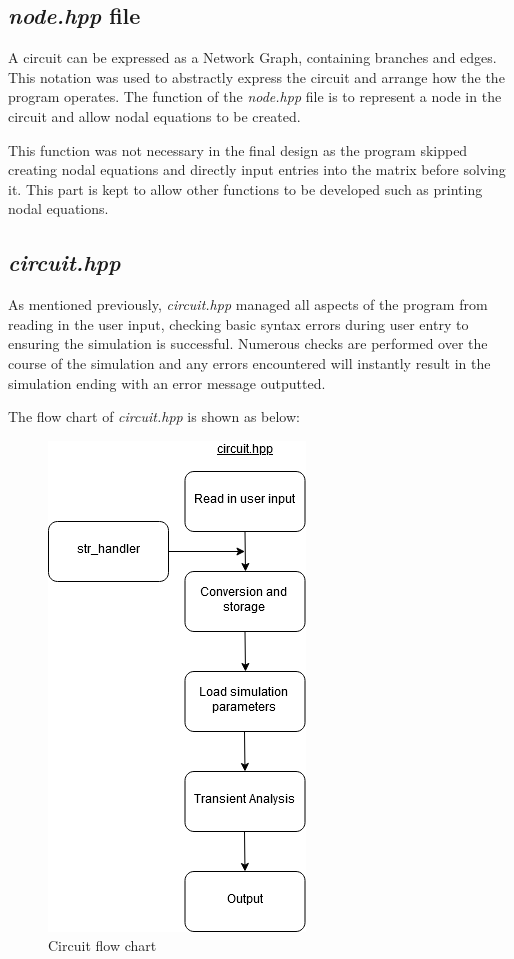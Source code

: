\documentclass[12pt,a4paper]{article}
\begin{document}
	\subsection{\textit{node.hpp} file}
	A circuit can be expressed as a Network Graph, containing branches and edges. This notation was used to abstractly express
	the circuit and arrange how the the program operates.
	The function of the \textit{node.hpp} file is to represent a node in the circuit and allow nodal equations
	to be created.\par
	This function was not necessary in the final design as the program skipped creating nodal
	equations and directly input entries into the matrix before solving it. This part is kept to allow other functions to 
	be developed such as printing nodal equations.
	\pagebreak
	\subsection{\textit{circuit.hpp}}
	As mentioned previously, \textit{circuit.hpp} managed all aspects of the program from 
	reading in the user input, checking basic syntax errors during user entry 
	to ensuring the simulation is successful.
	Numerous checks are performed over the course of the simulation and any errors encountered
	will instantly result in the simulation ending with an error message outputted. \par
	
	The flow chart of \textit{circuit.hpp} is shown as below: \par
	\begin{figure} [h!]
		\centering
		\includegraphics[scale=0.5]{circuit.PNG}
		\caption{Circuit flow chart}
	\end{figure}
	\pagebreak
\end{document}
